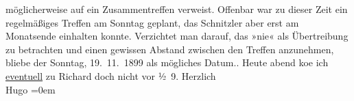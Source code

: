 \begin{ledgroupsized}[t]{13cm}
{{{                  möglicherweise auf ein Zusammentreffen verweist. Offenbar war zu dieser Zeit ein
                  regelmäßiges Treffen am Sonntag geplant, das Schnitzler aber erst am Monatsende einhalten konnte. Verzichtet man
                  darauf, das »nie« als Übertreibung zu betrachten und einen gewissen Abstand
                  zwischen den Treffen anzunehmen, bliebe der Sonntag, 19. 11. 1899 als
                  mögliches Datum.}}}\label{K_L00998_1h}.\pend
           \pstart
           Heute abend ko{\geminationm}e ich \uline{eventuell} zu Richard doch nicht vor
                  ½ 9.\pend
           \pstart
           Herzlich{\\[\baselineskip]}\spacefill\mbox{Hugo}\pend
           \leftskip=0em{}\endnumbering{}\end{ledgroupsized}  \newcommand{\dateiname}{L00998}\newcommand{\titel}{Hugo von Hofmannsthal an Arthur Schnitzler, [19. 11. 1899?]}\newcommand{\editorInnen}{Martin Anton Müller und Gerd-Hermann Susen}
      